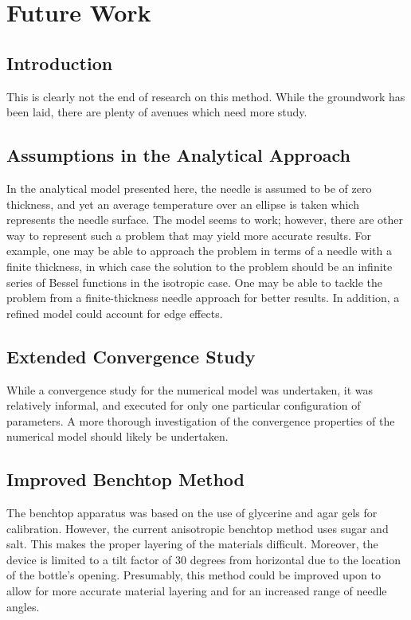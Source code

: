 \chapter{Future Work}

\section{Introduction}

This is clearly not the end of research on this method. While the groundwork has
been laid, there are plenty of avenues which need more study.

\section{Assumptions in the Analytical Approach}

In the analytical model presented here, the needle is assumed to be of zero
thickness, and yet an average temperature over an ellipse is taken which
represents the needle surface.  The model seems to work; however, there are
other way to represent such a problem that may yield more accurate results. For
example, one may be able to approach the problem in terms of a needle with a
finite thickness, in which case the solution to the problem should be an
infinite series of Bessel functions in the isotropic case. One may be able to
tackle the problem from a finite-thickness needle approach for better results. In addition, a refined model could account for edge effects. \cite{axialerror}

\section{Extended Convergence Study}

While a convergence study for the numerical model was undertaken, it was relatively
informal, and executed for only one particular configuration of parameters. A
more thorough investigation of the convergence properties of the numerical model
should likely be undertaken.

\section{Improved Benchtop Method}

The benchtop apparatus was based on the use of glycerine and agar gels for
calibration. However, the current anisotropic benchtop method uses sugar and
salt. This makes the proper layering of the materials difficult. Moreover, the
device is limited to a tilt factor of \(30\) degrees from horizontal due to the
location of the bottle's opening. Presumably, this method could be improved upon
to allow for more accurate material layering and for an increased range of
needle angles.

